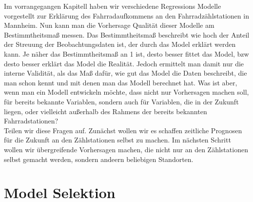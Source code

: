 \documentclass[a4paper,12pt]{thesis}
\begin{document}
Im vorrangegangen Kapitell haben wir verschiedene Regressions Modelle vorgestellt zur Erklärung des Fahrradaufkommens an den Fahrradzählstationen in Mannheim. Nun kann man die Vorhersage Qualität dieser Modelle am Bestimmtheitsmaß messen. Das Bestimmtheitsmaß beschreibt wie hoch der Anteil der Streuung der Beobachtungsdaten ist, der durch das Model erklärt werden kann. Je näher das Bestimmtheitsmaß an 1 ist, desto besser fittet das Model, bzw desto besser erklärt das Model die Realität. Jedoch ermittelt man damit nur die interne Validität, als das Maß dafür, wie gut das Model die Daten beschreibt, die man schon kennt und mit denen man das Modell berechnet hat. Was ist aber, wenn man ein Modell entwickeln möchte, dass nicht nur Vorhersagen machen soll, für bereits bekannte Variablen, sondern auch für Variablen, die in der Zukunft liegen, oder vielleicht außerhalb des Rahmens der bereits bekannten Fahrradstationen?\\
Teilen wir diese Fragen auf. Zunächst wollen wir es schaffen zeitliche Prognosen für die Zukunft an den Zählstationen selbst zu machen. Im nächsten Schritt wollen wir übergreifende Vorhersagen machen, die nicht nur an den Zählstationen selbst gemacht werden, sondern andeern beliebigen Standorten.\\

\section{Model Selektion}
\end{document}
